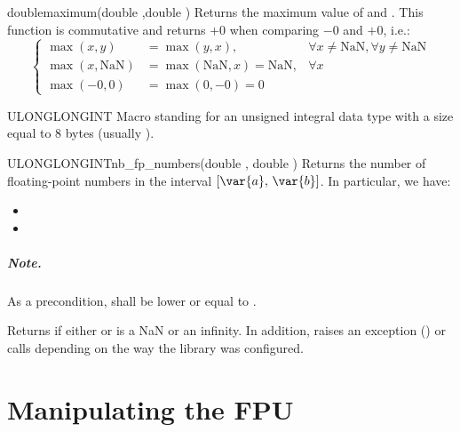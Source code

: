 \documentclass{manual}
\newcommand{\itv}[2]{\ensuremath{[#1,\,#2]}}
\begin{document}
\begin{deffun}{double}{maximum}{(double ,double )}
  Returns the maximum  value of 
  and . This function is commutative and returns $+0$ when comparing
  $-0$ and $+0$, i.e.:
\begin{equation*}
  \left\{\begin{array}{lll}
      \max(x,y) &= \max(y,x), &\forall x\neq\text{NaN}, \forall y\neq\text{NaN} \\
      \max(x,\text{NaN})&=\max(\text{NaN},x)=\text{NaN}, &\forall x\\
      \max(-0,0)&=\max(0,-0)=0
    \end{array}\right.
\end{equation*}
\end{deffun}

\begin{defmacro}{ULONGLONGINT}
  Macro standing for an unsigned integral data type with a size equal to 8 bytes
  (usually ).
\end{defmacro}

\begin{deffun}{ULONGLONGINT}{nb\_fp\_numbers}{(double , double )}
Returns the number of floating-point numbers in the interval
\itv{\var{a}}{\var{b}}. In particular, we have:
\begin{itemize}
\item {}
\item {}
\end{itemize}

\paragraph{Note.} As a precondition,  shall be lower or equal to .

Returns  if either
 or  is a NaN or an infinity. In addition, raises
an  exception () or calls
 depending on the way the library was configured.
\end{deffun}

\chapter{Manipulating the FPU}
\end{document}
